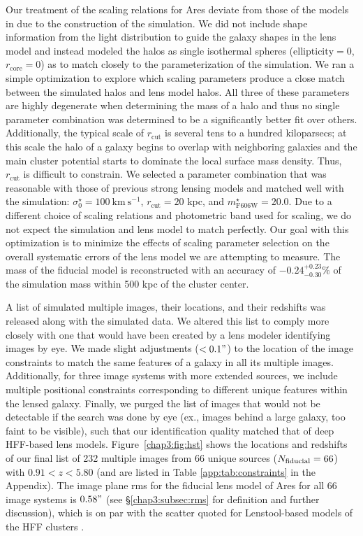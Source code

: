 Our treatment of the scaling relations for Ares deviate from those of the models in \citet{Johnson:2014tg} due to the construction of the simulation. We did not include shape information from the light distribution to guide the galaxy shapes in the lens model and instead modeled the halos as single isothermal spheres ($\mathrm{ellipticity} = 0$, $r_\mathrm{core} = 0$) as to match closely to the parameterization of the simulation. We ran a simple optimization to explore which scaling parameters produce a close match between the simulated halos and lens model halos. All three of these parameters are highly degenerate when determining the mass of a halo and thus no single parameter combination was determined to be a significantly better fit over others. Additionally, the typical scale of $r_\mathrm{cut}$ is several tens to a hundred kiloparsecs; at this scale the halo of a galaxy begins to overlap with neighboring galaxies and the main cluster potential starts to dominate the local surface mass density. Thus, $r_\mathrm{cut}$ is difficult to constrain. We selected a parameter combination that was reasonable with those of previous strong lensing models and matched well with the simulation: $\sigma_0^\star=100\ \mathrm{km\ s^{-1}}$, $r_\mathrm{cut} = 20$ kpc, and $m_\mathrm{F606W}^\star=20.0$. Due to a different choice of scaling relations and photometric band used for scaling, we do not expect the simulation and lens model to match perfectly. Our goal with this optimization is to minimize the effects of scaling parameter selection on the overall systematic errors of the lens model we are attempting to measure. The mass of the fiducial model is reconstructed with an accuracy of $-0.24^{+0.23}_{-0.30}\%$ of the simulation mass within 500 kpc of the cluster center.

A list of simulated multiple images, their locations, and their redshifts was released along with the simulated data. We altered this list to comply more closely with one that would have been created by a lens modeler identifying images by eye. We made slight adjustments ($<0.1"$) to the location of the image constraints to match the same features of a galaxy in all its multiple images. Additionally, for three image systems with more extended sources, we include multiple positional constraints corresponding to different unique features within the lensed galaxy. Finally, we purged the list of images that would not be detectable if the search was done by eye (ex., images behind a large galaxy, too faint to be visible), such that our identification quality matched that of deep HFF-based lens models. Figure~\ref{chap3:fig:hst} shows the locations and redshifts of our final list of 232 multiple images from 66 unique sources ($N_\mathrm{fiducial}=66$) with $0.91<z<5.80$ (and are listed in Table \ref{app:tab:constraints} in the Appendix). The image plane rms for the fiducial lens model of Ares for all 66 image systems is $0.58"$ (see \S\ref{chap3:subsec:rms} for definition and further discussion), which is on par with the scatter quoted for Lenstool-based models of the HFF clusters \citep{Treu:2016lr,Jauzac:2016dn,Sharon:2015xe,Jauzac:2015xy,Jauzac:2014qd,Johnson:2014tg,Richard:2014gf}. 

